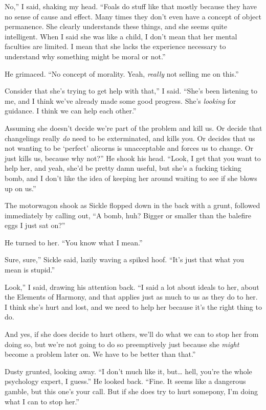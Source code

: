 \leavevmode{}No,” I said, shaking my head. “Foals do stuff like that mostly because they have no sense of cause and effect. Many times they don’t even have a concept of object permanence. She clearly understands these things, and she seems quite intelligent. When I said she was like a child, I don’t mean that her mental faculties are limited. I mean that she lacks the experience necessary to understand why something might be moral or not.”

He grimaced. “No concept of morality. Yeah, \textit{really} not selling me on this.”

\leavevmode{}Consider that she’s trying to get help with that,” I said. “She’s been listening to me, and I think we’ve already made some good progress. She’s \textit{looking} for guidance. I think we can help each other.”

\leavevmode{}Assuming she doesn’t decide we’re part of the problem and kill us. Or decide that changelings really \textit{do} need to be exterminated, and kills you. Or decides that us not wanting to be ‘perfect’ alicorns is unacceptable and forces us to change. Or just kills us, because why not?” He shook his head. “Look, I get that you want to help her, and yeah, she’d be pretty damn useful, but she’s a fucking ticking bomb, and I don’t like the idea of keeping her around waiting to see if she blows up on us.”

The motorwagon shook as Sickle flopped down in the back with a grunt, followed immediately by calling out, “A bomb, huh? Bigger or smaller than the balefire eggs I just sat on?”

He turned to her. “You know what I mean.”

\leavevmode{}Sure, sure,” Sickle said, lazily waving a spiked hoof. “It’s just that what you mean is stupid.”

\leavevmode{}Look,” I said, drawing his attention back. “I said a lot about ideals to her, about the Elements of Harmony, and that applies just as much to us as they do to her. I think she’s hurt and lost, and we need to help her because it’s the right thing to do.

\leavevmode{}And yes, if she does decide to hurt others, we’ll do what we can to stop her from doing so, but we’re not going to do so preemptively just because she \textit{might} become a problem later on. We have to be better than that.”

Dusty grunted, looking away. “I don’t much like it, but… hell, you’re the whole psychology expert, I guess.” He looked back. “Fine. It seems like a dangerous gamble, but this one’s your call. But if she does try to hurt somepony, I’m doing what I can to stop her.”

